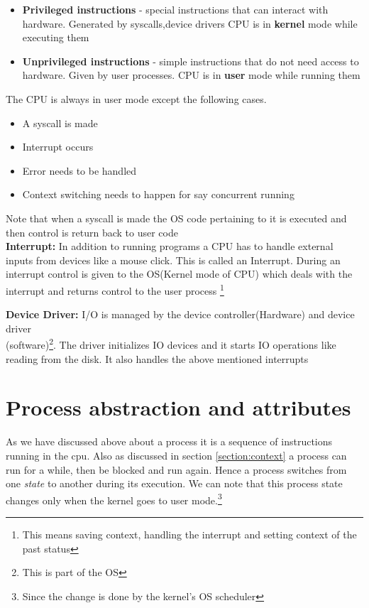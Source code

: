 \documentclass[12pt]{article}
\begin{document}
    \begin{itemize}[topsep=0pt, partopsep=0pt, itemsep=0pt, parsep=0pt]
        \item \textbf{Privileged instructions} - special instructions that can interact with hardware. Generated by syscalls,device drivers
        CPU is in \textbf{kernel} mode while executing them 
        \item \textbf{Unprivileged instructions} - simple instructions that do not need access to hardware. Given by user processes. CPU is in \textbf{user} mode while running them
    \end{itemize}

    The CPU is always in user mode except the following cases.
    \begin{itemize}[topsep=0pt, partopsep=0pt, itemsep=0pt, parsep=0pt]
        \item A syscall is made
        \item Interrupt occurs
        \item Error needs to be handled 
        \item Context switching needs to happen for say concurrent running
    \end{itemize}
    
    Note that when a syscall is made the OS code pertaining to it is executed and then control is return back to user code
    \\\textbf{Interrupt:} In addition to running programs a CPU has to handle external inputs from devices like a mouse click.
    This is called an Interrupt. During an interrupt control is given to the OS(Kernel mode of CPU) which deals with the interrupt and returns
    control to the user process \footnote{This means saving context, handling the interrupt and setting context of the past status}


    \noindent\textbf{Device Driver:} I/O is managed by the device controller(Hardware) and device driver\\(software)\footnote{This is part of the OS}.
    The driver initializes IO devices and it starts IO operations like reading from the disk. It also handles the above mentioned interrupts


    \section{Process abstraction and attributes}

    As we have discussed above about a process it is a sequence of instructions running in the cpu.
    Also as discussed in section \ref{section:context} a process can run for a while, then be blocked and run again.
    Hence a process switches from one \textit{state} to another during its execution. We can note that this process state changes only when the kernel goes to user mode.\footnote{Since the change is done by the kernel's OS scheduler}
\end{document}
